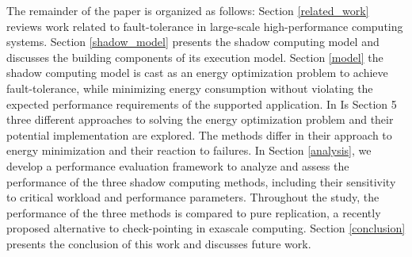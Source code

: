 The remainder of the paper is organized as follows: Section
\ref{related_work} reviews work related to fault-tolerance in
large-scale high-performance computing systems. Section
\ref{shadow_model} presents the shadow computing model and discusses
the building components of its execution model. Section \ref{model}
the shadow computing model is cast as an energy optimization problem
to achieve fault-tolerance, while minimizing energy consumption
without violating the expected performance requirements of the
supported application. In Is Section 5 three different approaches to
solving the energy optimization problem and their potential
implementation are explored. The methods differ in their approach to
energy minimization and their reaction to failures. In Section
\ref{analysis}, we develop a performance evaluation framework to
analyze and assess the performance of the three shadow computing
methods, including their sensitivity to critical workload and
performance parameters.  Throughout the study, the performance of the
three methods is compared to pure replication, a recently proposed
alternative to check-pointing in exascale computing.  Section
\ref{conclusion} presents the conclusion of this work and discusses
future work.
